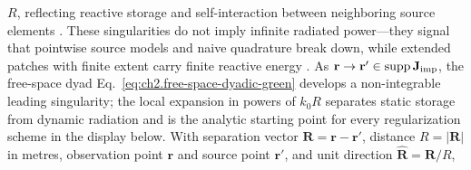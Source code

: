 $R$, reflecting reactive storage and self-interaction between neighboring source elements
\cite{stratton1941}. These singularities do not imply infinite radiated power---they signal
that pointwise source models and naive quadrature break down, while extended patches with
finite extent carry finite reactive energy \cite{jackson1999}. As
\(\mathbf{r}\to\mathbf{r}'\in\operatorname{supp}\mathbf{J}_{\mathrm{imp}}\), the free-space dyad
Eq.~\eqref{eq:ch2.free-space-dyadic-green} develops a non-integrable leading singularity;
the local expansion in powers of \(k_0 R\) separates static storage from dynamic radiation
and is the analytic starting point for every regularization scheme in the display below.
With separation vector \(\mathbf{R}=\mathbf{r}-\mathbf{r}'\), distance \(R=|\mathbf{R}|\) in
metres, observation point $\mathbf{r}$ and source point $\mathbf{r}'$, and unit direction
\(\widehat{\mathbf{R}}=\mathbf{R}/R\),

